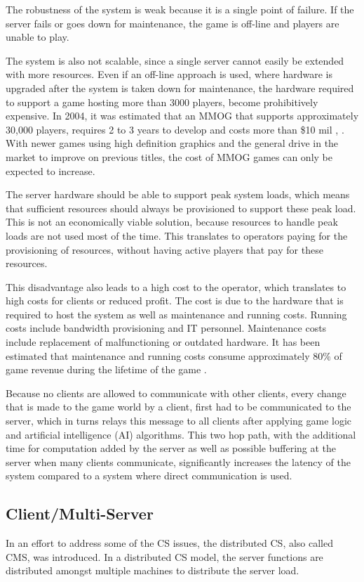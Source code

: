 \documentclass[10pt,a4paper,journal,cspaper,compsoc]{IEEEtran}
\begin{document}
The robustness of the system is weak because it is a single point of failure. If the server fails or goes down for maintenance, the game is off-line
and players are unable to play.

The system is also not scalable, since a single server cannot easily be extended with more resources. Even if an off-line approach is used, where
hardware is upgraded after the system is taken down for maintenance, the hardware required to support a game hosting more than 3000 players, become
prohibitively expensive. In 2004, it was estimated that an MMOG that supports approximately 30,000 players, requires 2 to 3 years to develop and
costs more than \$10 mil \cite{cs_mmog_cost}, \cite{igda_online_whitepaper}. With newer games using high definition graphics and the general drive in
the market to improve on previous titles, the cost of MMOG games can only be expected to increase.

The server hardware should be able to support peak system loads, which means that sufficient resources should always be provisioned to support these
peak load. This is not an economically viable solution, because resources to handle peak loads are not used most of the time. This translates to
operators paying for the provisioning of resources, without having active players that pay for these resources.

This disadvantage also leads to a high cost to the operator, which translates to high costs for clients or reduced profit. The cost is due to the
hardware that is required to host the system as well as maintenance and running costs. Running costs include bandwidth provisioning and IT personnel.
Maintenance costs include replacement of malfunctioning or outdated hardware. It has been estimated that maintenance and running costs consume
approximately 80\% of game revenue during the lifetime of the game \cite{cs_mmog_cost}.

Because no clients are allowed to communicate with other clients, every change that is made to the game world by a client, first had to be
communicated to the server, which in turns relays this message to all clients after applying game logic and artificial intelligence (AI) algorithms.
This two hop path, with the additional time for computation added by the server as well as possible buffering at the server when many clients
communicate, significantly increases the latency of the system compared to a system where direct communication is used.

\subsection{Client/Multi-Server}
In an effort to address some of the \ac{CS} issues, the distributed \ac{CS}, also called \ac{CMS}, was introduced. In a distributed \ac{CS} model,
the server functions are distributed amongst multiple machines to distribute the server load.
\end{document}

